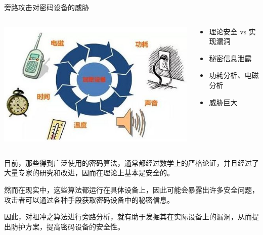 \documentclass{beamer}
\begin{document}
\begin{frame}{旁路攻击对密码设备的威胁}

\begin{columns}
    \begin{column}{0.5\textwidth}
        \includegraphics[width=\columnwidth]{./images/sca.jpg}
    \end{column}
    \begin{column}{0.5\textwidth}
        \begin{itemize}
            \item 理论安全 vs 实现漏洞
            \item 秘密信息泄露
            \item 功耗分析、电磁分析
            \item 威胁巨大
        \end{itemize}
    \end{column}
\end{columns}

\vspace{2\baselineskip}

目前，那些得到广泛使用的密码算法，通常都经过数学上的严格论证，并且经过了大量专家的研究和改进，因而在理论上基本是安全的。

\vspace{0.5\baselineskip}

然而在现实中，这些算法都运行在具体设备上，因此可能会暴露出许多安全问题，攻击者可以通过各种手段获取密码设备中的秘密信息。

\vspace{0.5\baselineskip}

因此，对祖冲之算法进行旁路分析，就有助于发掘其在实际设备上的漏洞，从而提出防护方案，提高密码设备的安全性。

\end{frame}
\end{document}
